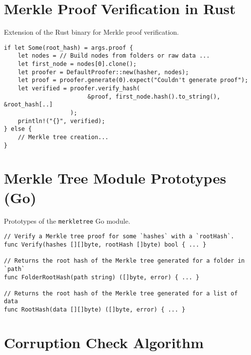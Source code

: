 \section{Merkle Proof Verification in Rust} \label{code:partial-mt-rs-2}
\begin{listing}[H]
\caption{Extension of the Rust binary for Merkle proof verification.}
\begin{verbatim}
if let Some(root_hash) = args.proof {
    let nodes = // Build nodes from folders or raw data ...
    let first_node = nodes[0].clone();
    let proofer = DefaultProofer::new(hasher, nodes);
    let proof = proofer.generate(0).expect("Couldn't generate proof");
    let verified = proofer.verify_hash(
                        &proof, first_node.hash().to_string(), &root_hash[..]
                   );
    println!("{}", verified);
} else {
    // Merkle tree creation...
}
\end{verbatim}
\end{listing}

\section{Merkle Tree Module Prototypes (Go)} \label{code:prototypes-merkletree-module}

\begin{listing}[H]
\caption{Prototypes of the \texttt{merkletree} Go module.}
\begin{verbatim}
// Verify a Merkle tree proof for some `hashes` with a `rootHash`.
func Verify(hashes [][]byte, rootHash []byte) bool { ... }

// Returns the root hash of the Merkle tree generated for a folder in `path`
func FolderRootHash(path string) ([]byte, error) { ... }

// Returns the root hash of the Merkle tree generated for a list of data
func RootHash(data [][]byte) ([]byte, error) { ... }
\end{verbatim}
\end{listing}


\section{Corruption Check Algorithm} \label{code:check-corruption-algorithm}

